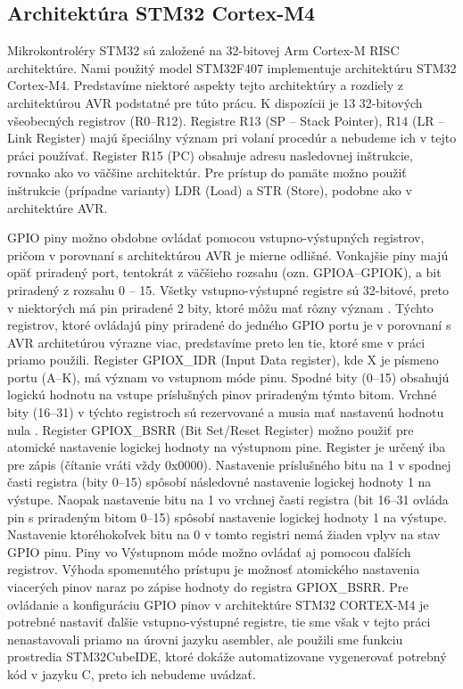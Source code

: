 \subsection{Architektúra STM32 Cortex-M4}
Mikrokontroléry STM32 sú založené na 32-bitovej Arm Cortex-M RISC architektúre. Nami použitý model STM32F407 implementuje architektúru STM32 Cortex-M4. Predstavíme niektoré aspekty tejto architektúry a rozdiely z architektúrou AVR podstatné pre túto prácu. K dispozícii je 13 32-bitových všeobecných registrov (R0--R12). Registre R13 (SP -- Stack Pointer), R14 (LR -- Link Register) majú špeciálny význam pri volaní procedúr \cite{stmInstruction} a nebudeme ich v tejto práci používať. Register R15 (PC) obsahuje adresu nasledovnej inštrukcie, rovnako ako vo väčšine architektúr. Pre prístup do pamäte možno použiť inštrukcie (prípadne varianty) LDR (Load) a STR (Store), podobne ako v architektúre AVR.

GPIO piny možno obdobne ovládať pomocou vstupno-výstupných registrov, pričom v porovnaní s architektúrou AVR je mierne odlišné. Vonkajšie piny majú opäť priradený port, tentokrát z väčšieho rozsahu (ozn. GPIOA--GPIOK), a bit priradený z rozsahu 0 -- 15. Všetky vstupno-výstupné registre sú 32-bitové, preto v niektorých má pin priradené 2 bity, ktoré môžu mať rôzny význam \cite{stmReference}. Týchto registrov, ktoré ovládajú piny priradené do jedného GPIO portu je v porovnaní s AVR architetúrou výrazne viac, predstavíme preto len tie, ktoré sme v práci priamo použili. Register GPIOX\_IDR (Input Data register), kde X je písmeno portu (A--K), má význam vo vstupnom móde pinu. Spodné bity (0--15) obsahujú logickú hodnotu na vstupe príslušných pinov priradeným týmto bitom. Vrchné bity (16--31) v týchto registroch sú rezervované a musia mať nastavenú hodnotu nula \cite{stmReference}. Register GPIOX\_BSRR (Bit Set/Reset Register) možno použiť pre atomické nastavenie logickej hodnoty na výstupnom pine. Register je určený iba pre zápis (čítanie vráti vždy 0x0000). Nastavenie príslušného bitu na 1 v spodnej časti registra (bity 0--15) spôsobí následovné nastavenie logickej hodnoty 1 na výstupe. Naopak nastavenie bitu na 1 vo vrchnej časti registra (bit 16--31 ovláda pin s priradeným bitom 0--15) spôsobí nastavenie logickej hodnoty 1 na výstupe. Nastavenie ktoréhokoľvek bitu na 0 v tomto registri nemá žiaden vplyv na stav GPIO pinu. Piny vo Výstupnom móde možno ovládať aj pomocou ďalších registrov. Výhoda spomenutého prístupu je možnosť atomického nastavenia viacerých pinov naraz po zápise hodnoty do registra GPIOX\_BSRR. Pre ovládanie a konfiguráciu GPIO pinov v architektúre STM32 CORTEX-M4 je potrebné nastaviť ďalšie vstupno-výstupné registre, tie sme však v tejto práci nenastavovali priamo na úrovni jazyku asembler, ale použili sme funkciu prostredia STM32CubeIDE, ktoré dokáže automatizovane vygenerovať potrebný kód v jazyku C, preto ich nebudeme uvádzať.

